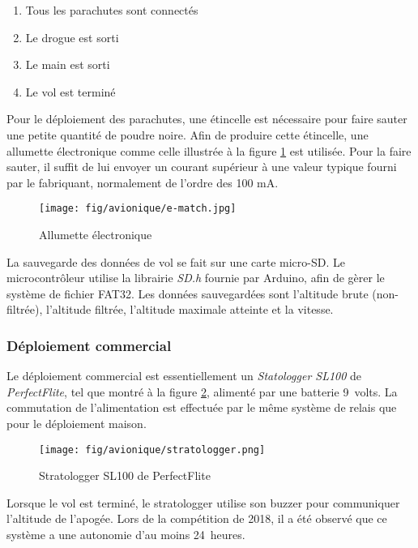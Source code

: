 \begin{enumerate}
	\item Tous les parachutes sont connectés
	\item Le drogue est sorti
	\item Le main est sorti
	\item Le vol est terminé
\end{enumerate}



Pour le déploiement des parachutes, une étincelle est nécessaire pour faire
sauter une petite quantité de poudre noire. Afin de produire cette étincelle,
une allumette électronique comme celle illustrée à la figure \ref{f:e-match} est
utilisée. Pour la faire sauter, il suffit de lui envoyer un courant supérieur
à une valeur typique fourni par le fabriquant, normalement de l'ordre des
100 mA.

\begin{figure}[H]
	\center
	\texttt{[image: fig/avionique/e-match.jpg]}
	\caption{Allumette électronique}
	\label{f:e-match}
\end{figure}


La sauvegarde des données de vol se fait sur une carte micro-SD. Le
microcontrôleur utilise la librairie \textit{SD.h} fournie par Arduino, afin
de gèrer le système de fichier FAT32. Les données sauvegardées sont l'altitude
brute (non-filtrée), l'altitude filtrée, l'altitude maximale atteinte et la
vitesse.

\subsubsection{Déploiement commercial}

Le déploiement commercial est essentiellement un \textit{Statologger SL100}
de \textit{PerfectFlite}, tel que montré à la figure \ref{f:stratologger},
alimenté par une batterie 9~volts. La commutation de l'alimentation est
effectuée par le même système de relais que pour le déploiement maison.

\begin{figure}[H]
	\center
	\texttt{[image: fig/avionique/stratologger.png]}
	\caption{Stratologger SL100 de PerfectFlite}
	\label{f:stratologger}
\end{figure}

Lorsque le vol est terminé, le stratologger utilise son buzzer pour communiquer
l'altitude de l'apogée. Lors de la compétition de 2018, il a été observé que
ce système a une autonomie d'au moins 24~heures.

